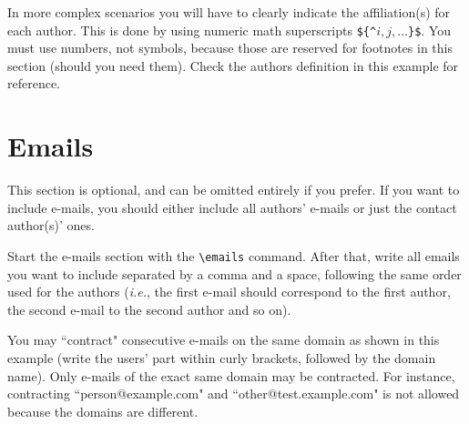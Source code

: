 \documentclass{article}
\begin{document}
In more complex scenarios you will have to clearly indicate the affiliation(s) for each author. This is done by using numeric math superscripts {\tt \$\{\^{}$i,j, \ldots$\}\$}. You must use numbers, not symbols, because those are reserved for footnotes in this section (should you need them). Check the authors definition in this example for reference.

\section{Emails}

This section is optional, and can be omitted entirely if you prefer. If you want to include e-mails, you should either include all authors' e-mails or just the contact author(s)' ones.

Start the e-mails section with the {\tt \textbackslash{}emails} command. After that, write all emails you want to include separated by a comma and a space, following the same order used for the authors (\emph{i.e.}, the first e-mail should correspond to the first author, the second e-mail to the second author and so on).

You may ``contract" consecutive e-mails on the same domain as shown in this example (write the users' part within curly brackets, followed by the domain name). Only e-mails of the exact same domain may be contracted. For instance, contracting ``person@example.com" and ``other@test.example.com" is not allowed because the domains are different.
\end{document}
